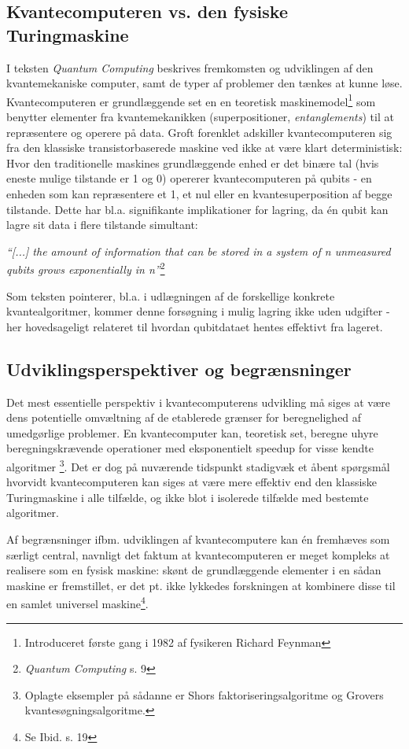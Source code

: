 \documentclass[10pt,a4paper]{article}
\newcommand{\citat}[2]{\begin{justify}\textit{``#1''}\hspace{0.1cm}\footnote{#2}\end{justify}}
\begin{document}
\subsection{Kvantecomputeren vs. den fysiske Turingmaskine}
I teksten \textit{Quantum Computing} beskrives fremkomsten og udviklingen 
af den kvantemekaniske computer, samt de typer af problemer den tænkes at
kunne løse.
Kvantecomputeren er grundlæggende set en en teoretisk maskinemodel\footnote{
Introduceret første gang i 1982 af fysikeren Richard Feynman} som benytter 
elementer fra kvantemekanikken (superpositioner, \textit{entanglements}) til 
at repræsentere og operere på data. Groft forenklet adskiller kvantecomputeren
sig fra den klassiske transistorbaserede maskine ved ikke at være klart
deterministisk: Hvor den traditionelle maskines grundlæggende enhed er det binære 
tal (hvis eneste mulige tilstande er 1 og 0) opererer kvantecomputeren på qubits
- en enheden som kan repræsentere et 1, et nul eller en kvantesuperposition af 
begge tilstande. Dette har bl.a. signifikante implikationer for lagring, da én qubit 
kan lagre sit data i flere tilstande simultant: 
\citat{[...] the amount of information that can be stored in a system of  
\textit{n} unmeasured qubits grows exponentially in \textit{n}}{\textit{Quantum Computing} s. 9}
Som teksten 
pointerer, bl.a. i udlægningen af de forskellige konkrete kvantealgoritmer, 
kommer denne forsøgning i mulig lagring ikke uden udgifter - her hovedsageligt 
relateret til hvordan qubitdataet hentes effektivt fra lageret. 

\subsection{Udviklingsperspektiver og begrænsninger}
Det mest essentielle perspektiv i kvantecomputerens udvikling må siges at være 
dens potentielle omvæltning af de etablerede grænser for beregnelighed af 
umedgørlige problemer. En kvantecomputer kan, teoretisk set, beregne uhyre 
beregningskrævende operationer med eksponentielt speedup for visse kendte algoritmer \footnote{Oplagte eksempler på sådanne er Shors faktoriseringsalgoritme og
Grovers kvantesøgningsalgoritme.}. Det er dog på nuværende tidspunkt stadigvæk 
et åbent spørgsmål hvorvidt kvantecomputeren kan siges at være mere effektiv
end den klassiske Turingmaskine i alle tilfælde, og ikke blot i isolerede tilfælde
med bestemte algoritmer. 

Af begrænsninger ifbm. udviklingen af kvantecomputere kan én fremhæves som særligt
central, navnligt det faktum at kvantecomputeren er meget kompleks at realisere 
som en fysisk maskine: skønt de grundlæggende elementer i en sådan maskine er 
fremstillet, er det pt. ikke lykkedes forskningen at kombinere disse til en samlet
universel maskine\footnote{Se Ibid. s. 19}.
\end{document}
